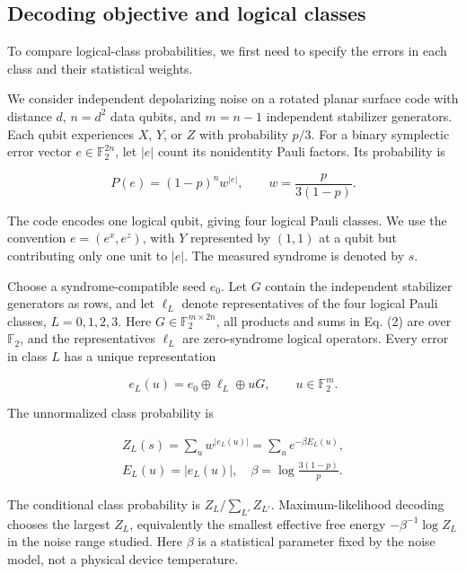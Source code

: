 \documentclass[aps,prapplied,reprint,superscriptaddress,amsmath,amssymb,floatfix,nofootinbib]{revtex4-2}
\begin{document}
\subsection{Decoding objective and logical
classes}\label{a.-decoding-objective-and-logical-classes}

To compare logical-class probabilities, we first need to specify the
errors in each class and their statistical weights.

We consider independent depolarizing noise on a rotated planar surface
code with distance \(d\), \(n=d^2\) data qubits, and \(m=n-1\)
independent stabilizer generators. Each qubit experiences \(X\), \(Y\),
or \(Z\) with probability \(p/3\). For a binary symplectic error vector
\(e\in\mathbb F_2^{2n}\), let \(|e|\) count its nonidentity Pauli
factors. Its probability is

\[
P(e)=(1-p)^n w^{|e|},\qquad w=\frac{p}{3(1-p)}.
\tag{1}\label{eq:1}
\]

The code encodes one logical qubit, giving four logical Pauli classes.
We use the convention \(e=(e^x,e^z)\), with \(Y\) represented by
\((1,1)\) at a qubit but contributing only one unit to \(|e|\). The
measured syndrome is denoted by \(s\).

Choose a syndrome-compatible seed \(e_0\). Let \(G\) contain the
independent stabilizer generators as rows, and let \(\ell_L\) denote
representatives of the four logical Pauli classes, \(L=0,1,2,3\). Here
\(G\in\mathbb F_2^{m\times2n}\), all products and sums in Eq. (2) are
over \(\mathbb F_2\), and the representatives \(\ell_L\) are
zero-syndrome logical operators. Every error in class \(L\) has a unique
representation

\[
e_L(u)=e_0\oplus\ell_L\oplus uG,\qquad u\in\mathbb F_2^m.
\tag{2}\label{eq:2}
\]

The unnormalized class probability is

\[
\begin{gathered}
Z_L(s)=\sum_u w^{|e_L(u)|}
=\sum_u e^{-\beta E_L(u)},\\
E_L(u)=|e_L(u)|,\quad \beta=\log\frac{3(1-p)}p.
\end{gathered}
\tag{3}\label{eq:3}
\]

The conditional class probability is \(Z_L/\sum_{L'}Z_{L'}\).
Maximum-likelihood decoding chooses the largest \(Z_L\), equivalently
the smallest effective free energy \(-\beta^{-1}\log Z_L\) in the noise
range studied. Here \(\beta\) is a statistical parameter fixed by the
noise model, not a physical device temperature.
\end{document}
